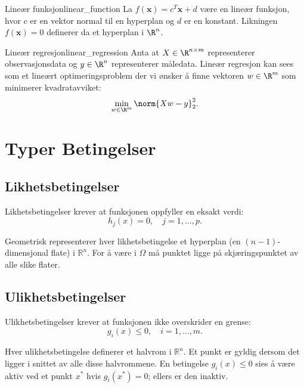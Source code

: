 \begin{example}{Lineær funksjon}{linear_function}
	La \(f(\symbf{x}) = c^T\symbf{x} + d\) være en lineær funksjon, hvor \(c\) er en vektor normal til en hyperplan og \(d\) er en konstant. Likningen \(f(\symbf{x}) = 0\) definerer da et hyperplan i \(\R^n\).
\end{example}

\begin{example}{Lineær regresjon}{linear_regression}
	Anta at \(X \in \R^{n \times m}\) representerer observasjonsdata og \(y \in \R^n\) representerer måledata. Lineær regresjon kan sees som et lineært optimeringsproblem der vi ønsker å finne vektoren \(w \in \R^m\) som minimerer kvadratavviket:
	\begin{equation*}
		\min_{w \in \R^m} \norm{Xw - y}_2^2.
	\end{equation*}
\end{example}

\section{Typer Betingelser}

\subsection{Likhetsbetingelser}
Likhetsbetingelser krever at funksjonen oppfyller en eksakt verdi:
\begin{equation*}
	h_j(x) = 0, \quad j = 1,\ldots,p.
\end{equation*}

Geometrisk representerer hver likhetsbetingelse et hyperplan (en \((n-1)\)-dimensjonal flate) i $\mathbb{R}^n$. For å være i $\Omega$ må punktet ligge på skjæringspunktet av alle slike flater.

\subsection{Ulikhetsbetingelser}
Ulikhetsbetingelser krever at funksjonen ikke overskrider en grense:
\begin{equation*}
	g_i(x) \leq 0, \quad i = 1,\ldots,m.
\end{equation*}

Hver ulikhetsbetingelse definerer et halvrom i $\mathbb{R}^n$. Et punkt er gyldig dersom det ligger i snittet av alle disse halvrommene. En betingelse $g_i(x) \leq 0$ sies å være aktiv ved et punkt $x^*$ hvis $g_i(x^*) = 0$; ellers er den inaktiv.


